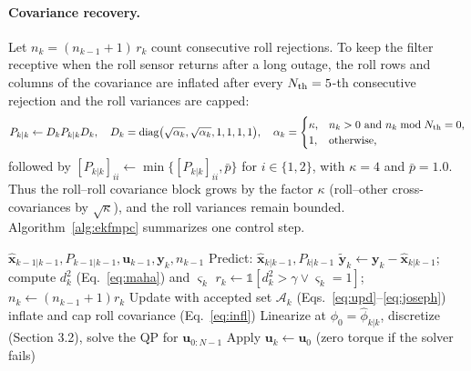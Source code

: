 \documentclass[preprint,12pt,authoryear=false]{elsarticle}
\theoremstyle{remark}\newtheorem{remark}{Remark}
\theoremstyle{plain}\newtheorem{proposition}{Proposition}\newtheorem{lemma}{Lemma}
\theoremstyle{definition}\newtheorem{assumption}{Assumption}
\begin{document}
\paragraph{Covariance recovery.} Let $n_k=(n_{k-1}+1)\,r_k$ count consecutive roll rejections. To keep the filter receptive when the roll sensor returns after a long outage, the roll rows and columns of the covariance are inflated after every $N_{\rm th}=5$-th consecutive rejection and the roll variances are capped:
\begin{equation}
P_{k|k}\leftarrow D_k P_{k|k}D_k,\quad D_k=\mathrm{diag}\big(\sqrt{\alpha_k},\sqrt{\alpha_k},1,1,1,1\big),\quad
\alpha_k=\begin{cases}\kappa,& n_k>0\ \text{and}\ n_k\bmod N_{\rm th}=0,\\1,&\text{otherwise,}\end{cases}\label{eq:infl}
\end{equation}
followed by $[P_{k|k}]_{ii}\leftarrow\min\{[P_{k|k}]_{ii},\bar p\}$ for $i\in\{1,2\}$, with $\kappa=4$ and $\bar p=1.0$. Thus the roll--roll covariance block grows by the factor $\kappa$ (roll--other cross-covariances by $\sqrt\kappa$), and the roll variances remain bounded. Algorithm~\ref{alg:ekfmpc} summarizes one control step.

\begin{algorithm}[t]
\caption{One step of EKF--MPC with robust roll-channel validation}\label{alg:ekfmpc}
\begin{algorithmic}[1]
\Require $\hat{\bm x}_{k-1|k-1},P_{k-1|k-1},\bm u_{k-1},\bm y_k,n_{k-1}$
\State Predict: $\hat{\bm x}_{k|k-1},P_{k|k-1}$
\State $\tilde{\bm y}_k\gets\bm y_k-\hat{\bm x}_{k|k-1}$; compute $d_k^2$ (Eq.~\eqref{eq:maha}) and $\varsigma_k$
\State $r_k\gets\mathbb 1[d_k^2>\gamma\lor\varsigma_k=1]$; $n_k\gets(n_{k-1}+1)r_k$
\State Update with accepted set $\mathcal A_k$ (Eqs.~\eqref{eq:upd}--\eqref{eq:joseph})
 inflate and cap roll covariance (Eq.~\eqref{eq:infl})\EndIf
\State Linearize at $\phi_0=\hat\phi_{k|k}$, discretize (Section 3.2), solve the QP for $\bm u_{0:N-1}$
\State Apply $\bm u_k\gets\bm u_0$ (zero torque if the solver fails)
\end{algorithmic}
\end{algorithm}
\end{document}
